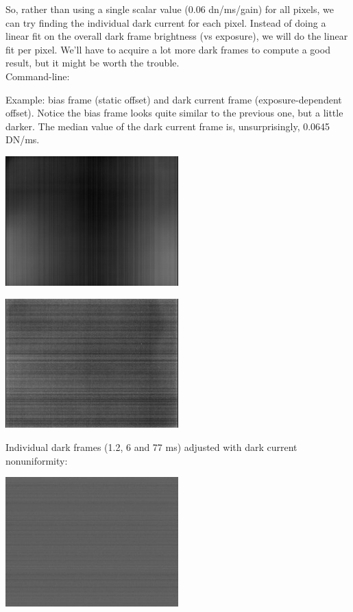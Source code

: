 So, rather than using a single scalar value (0.06 dn/ms/gain) for all pixels, we can try finding the individual dark current for each pixel. Instead of doing a linear fit on the overall dark frame brightness (vs exposure), we will do the linear fit per pixel. We'll have to acquire a lot more dark frames to compute a good result, but it might be worth the trouble.\\

Command-line:\\


Example: bias frame (static offset) and dark current frame (exposure-dependent offset). Notice the bias frame looks quite similar to the previous one, but a little darker. The median value of the dark current frame is, unsurprisingly, 0.0645 DN/ms. 

\begin{center}
\includegraphics[height=5cm]{images/darkframe-x1-no-blackcol-darkcurrent-256}
\end{center}

\begin{center}
\includegraphics[height=5cm]{images/dcnuframe-x1-no-blackcol-darkcurrent-256}
\end{center}

Individual dark frames (1.2, 6 and 77 ms) adjusted with dark current nonuniformity: 

\begin{center}
\includegraphics[height=5cm]{images/blackframes-gainx1-offset2047-1ms-01-darkcurrent-no-blackcol}
\end{center}

